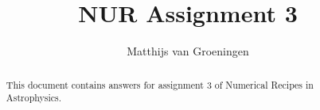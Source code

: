 \documentclass[a4paper,10pt]{article}
\title{NUR Assignment 3}
\author{Matthijs van Groeningen}
\begin{document}
\maketitle

\begin{abstract}
This document contains answers for assignment 3 of Numerical Recipes in Astrophysics. 
\end{abstract}

\newpage



\newpage


\end{document}
